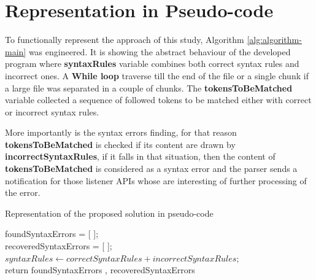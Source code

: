 \section{Representation in Pseudo-code}
To functionally represent the approach of this study, Algorithm \ref{alg:algorithm-main} was engineered. It is showing the abstract behaviour of the developed program where \textbf{syntaxRules} variable combines both correct syntax rules and incorrect ones. A \textbf{While loop} traverse till the end of the file or a single chunk if a large file was separated in a couple of chunks. The \textbf{tokensToBeMatched}  variable collected a sequence of followed tokens to be matched either with correct or incorrect syntax rules.

More importantly is the syntax errors finding, for that reason \textbf{tokensToBeMatched} is checked if its content are drawn by \textbf{incorrectSyntaxRules}, if it falls in that situation, then the content of \textbf{tokensToBeMatched} is considered as a syntax error and the parser sends a notification for those listener APIs  whose are interesting of further processing of the error. 

\begin{algorithm}[H] 
 \caption{Representation of the proposed solution  in pseudo-code}
 \label{alg:algorithm-main}

foundSyntaxErrors = [ ];\\
recoveredSyntaxErrors = [ ];\\
$syntaxRules \leftarrow correctSyntaxRules + incorrectSyntaxRules;$\\
return foundSyntaxErrors , recoveredSyntaxErrors
\end{algorithm}

